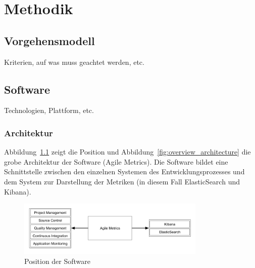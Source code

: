 \chapter{Methodik}

\section{Vorgehensmodell}

Kriterien, auf was muss geachtet werden, etc.

\section{Software}

Technologien, Plattform, etc.

\subsection{Architektur}

Abbildung~\ref{fig:position_architecture} zeigt die Position und Abbildung~\ref{fig:overview_architecture} die grobe Architektur der Software (Agile Metrics).
Die Software bildet eine Schnittstelle zwischen den einzelnen Systemen des Entwicklungsprozesses und dem System zur Darstellung der Metriken (in diesem Fall ElasticSearch und Kibana).

\begin{savenotes}
    \begin{figure}[H] 
        \centering
            \includegraphics[width=0.8\textwidth]{img/position-overview.png}
        \caption{Position der Software}\label{fig:position_architecture}
    \end{figure}
\end{savenotes}

